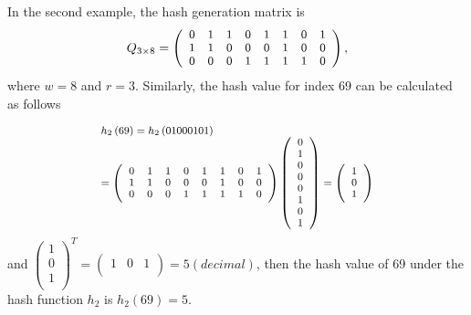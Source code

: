 \documentclass[10pt,journal,letterpaper]{IEEEtran}
\begin{document}
In the second example, the hash generation matrix is
\begin{equation}
\footnotesize
{Q_{3 \times 8}} = \left( {\begin{array}{*{20}{c}}
   0 & 1 & 1 & 0 & 1 & 1 & 0 & 1  \\
   1 & 1 & 0 & 0 & 0 & 1 & 0 & 0  \\
   0 & 0 & 0 & 1 & 1 & 1 & 1 & 0  \\
\end{array}} \right),
\label{eq:h2matrix}
\end{equation}
where $w=8$ and $r=3$. Similarly, the hash value for index 69 can be calculated as follows

\begin{equation}
\scriptsize
\begin{array}{l}
 {h_2}\left( {69} \right) = h_2\left( {{\rm{01000101}}} \right) \\
  = \left( {\begin{array}{*{20}{c}}
   0 & 1 & 1 & 0 & 1 & 1 & 0 & 1  \\
   1 & 1 & 0 & 0 & 0 & 1 & 0 & 0  \\
   0 & 0 & 0 & 1 & 1 & 1 & 1 & 0  \\
\end{array}} \right)\left( {\begin{array}{*{20}{c}}
   0  \\
   1  \\
   0  \\
   0  \\
   0  \\
   1  \\
   0  \\
   1  \\
\end{array}} \right) = \left( {\begin{array}{*{20}{c}}
   1  \\
   0  \\
   1  \\
\end{array}} \right) \\
 \end{array}
\label{eq:h3example2}
\end{equation}
\noindent and ${\left( {\begin{array}{*{20}{c}}
   1  \\
   0 \\
   1  \\
\end{array}} \right)^T} = \left( {\begin{array}{*{20}{c}}
   1 & 0 & 1  \\
\end{array}} \right) = 5\left( decimal \right)$, then the hash value of 69 under the hash function $h_2$ is $h_2(69)=5$.
\end{document}
